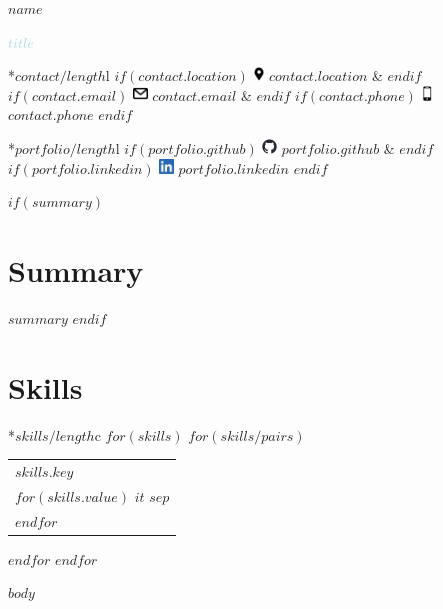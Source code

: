 \documentclass[10pt]{article}
\begin{document}
\begin{center}
{\Huge \textbf{$name$}}

{\Large \textcolor{lightblue}{$title$}}

\begin{tabular}{*{$contact/length$}{l}}
    $if(contact.location)$
        \includegraphics[height=11pt]{logos/location.png} $contact.location$ &
    $endif$
    $if(contact.email)$
        \includegraphics[height=11pt]{logos/mail.png} $contact.email$ &
    $endif$
    $if(contact.phone)$
        \includegraphics[height=11pt]{logos/mobile.png} $contact.phone$
    $endif$
\end{tabular}

\begin{tabular}{*{$portfolio/length$}{l}}
    $if(portfolio.github)$
        \includegraphics[height=11pt]{logos/github-mark.png} $portfolio.github$ &
    $endif$
    $if(portfolio.linkedin)$
        \includegraphics[height=11pt]{logos/LI-In-Bug.png} $portfolio.linkedin$
    $endif$
\end{tabular}
\end{center}

$if(summary)$
\section{Summary}
$summary$
$endif$

\bigskip

\section{Skills}
\begin{tabular}{*{$skills/length$}{c}}
    $for(skills)$
        $for(skills/pairs)$
            \begin{tabular}[t]{l}
                \textbf{$skills.key$}\\
                $for(skills.value)$
                    $it$ $sep$\\
                $endfor$
            \end{tabular}
        $endfor$
    $endfor$
\end{tabular}

$body$
\end{document}
